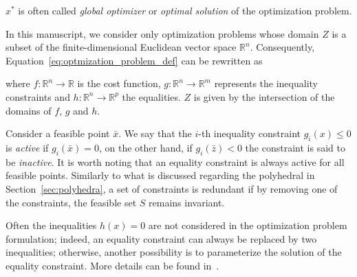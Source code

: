 $x^*$ is often called \emph{global optimizer} or \emph{optimal solution} of the optimization problem.
\par
In this manuscript, we consider only optimization problems whose domain $Z$ is a subset of the finite-dimensional Euclidean vector space $\mathbb{R}^n$. Consequently, Equation~\eqref{eq:optmization_problem_def} can be rewritten as 
where $f:\mathbb{R}^n \rightarrow \mathbb{R}$ is the cost function, $g: \mathbb{R}^n \rightarrow \mathbb{R}^m$ represents the inequality constraints and $h: \mathbb{R}^n  \rightarrow \mathbb{R}^p$ the equalities. $Z$ is given by the intersection of the domains of $f$, $g$ and $h$.
\par
Consider a feasible point $\bar{x}$. We say that the $i$-th inequality constraint $g_i(x) \le 0$ is \emph{active} if $g_i(\bar{x}) = 0$, on the other hand, if $g_i(\bar{z}) < 0$ the constraint is said to be \emph{inactive}. It is worth noting that an equality constraint is always active for all feasible points. Similarly to what is discussed regarding the polyhedral in Section~\ref{sec:polyhedra}, a set of constraints is redundant if by removing one of the constraints, the feasible set $S$ remains invariant. 
\par
Often the inequalities $h(x) = 0$ are not considered in the optimization problem formulation; indeed, an equality constraint can always be replaced by two inequalities; otherwise, another possibility is to parameterize the solution of the equality constraint.  More details can be found in~\citep[Chapter 1.1.1]{Borrelli2017PredictiveSystems}.

